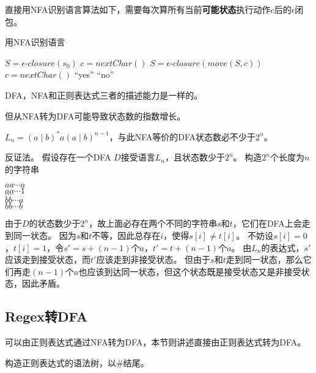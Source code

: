 直接用NFA识别语言算法如下，需要每次算所有当前\textbf{可能状态}执行动作$c$后的$\epsilon$闭包。
\begin{algorithm}[H]
\centering
\caption{用NFA识别语言}
\begin{algorithmic}[1]
\State $S=\epsilon$-$closure(s_0)$
\State $c=nextChar()$
\State $S=\epsilon$-$closure(move(S,c))$
\State $c=nextChar()$
\EndWhile
{}
\State\Return ``yes''
\Else
\State\Return ``no''
\EndIf
\end{algorithmic}
\end{algorithm}

\begin{theorem}
DFA，NFA和正则表达式三者的描述能力是一样的。
\end{theorem}

但从NFA转为DFA可能导致状态数的指数增长。
\begin{example}
$L_n=(a\mid b)^*a(a\mid b)^{n-1}$，与此NFA等价的DFA状态数必不少于$2^n$。
\end{example}
\begin{analysis}
反证法。
假设存在一个DFA $D$接受语言$L_n$，且状态数少于$2^n$。
构造$2^n$个长度为$n$的字符串
\begin{flushleft}
$aa\cdots a$\\
$aa\cdots 1$\\
$\cdots$\\
$bb\cdots a$\\
$bb\cdots b$
\end{flushleft}
由于$D$的状态数少于$2^n$，故上面必存在两个不同的字符串$s$和$t$，它们在DFA上会走到同一状态。
因为$s$和$t$不等，因此总存在$i$，使得$s[i]\ne t[i]$。
不妨设$s[i]=0$，$t[i]=1$，令$s'=s+(n-1)$个$a$，$t'=t+(n-1)$个$a$。
由$L_n$的表达式，$s'$应该走到接受状态，而$t'$应该走到非接受状态。
但由于$s$和$t$走到同一状态，那么它们再走$(n-1)$个$a$也应该到达同一状态，但这个状态既是接受状态又是非接受状态，因此矛盾。
\end{analysis}

\subsection{Regex转DFA}
可以由正则表达式通过NFA转为DFA，本节则讲述直接由正则表达式转为DFA。

构造正则表达式的语法树，以\#结尾。

